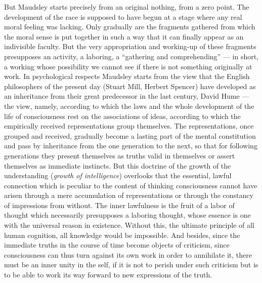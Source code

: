 \documentclass[12pt,a4paper,openany]{book}
\newcommand{\opage}[1]{\marginnote{\footnotesize\textit{[#1]}}}
\begin{document}
\opage{328}But Maudsley starts precisely from an original nothing,
from a zero point. The development of the race is supposed to have begun at
a stage where any real moral feeling was lacking. Only
gradually are the fragments gathered from which the moral
sense is put together in such a way that it can finally appear
as an indivisible faculty. But the very appropriation and working-up
of these fragments presupposes an activity, a
laboring, a ``gathering and comprehending'' --- in short, a working
whose possibility we cannot see if there is not
something originally at work. In psychological respects
Maudsley starts from the view that the English philosophers
of the present day (Stuart Mill, Herbert Spencer) have developed
as an inheritance from their great predecessor in the last century,
David Hume --- the view, namely, according to which the laws and the
whole development of the life of consciousness rest on the associations of ideas,
according to which the empirically received representations group
themselves. The representations, once grouped and received,
gradually become a lasting part of the mental constitution
and pass by inheritance from the one generation to the next, so that
for following generations they present themselves as truths valid in themselves
or assert themselves as immediate instincts.
But this doctrine of the growth of the understanding (\textit{growth of intelligence})
overlooks that the essential, lawful connection
which is peculiar to the content of thinking consciousness
cannot have arisen through a mere accumulation of representations
or through the constancy of impressions from without. The
inner lawfulness is the fruit of a labor of thought which necessarily
presupposes a laboring thought, whose essence is
one with the universal reason in existence. Without this, the
ultimate principle of all human cognition, all
knowledge would be impossible. And besides, since the immediate truths
in the course of time become objects of criticism, since consciousness
can thus turn against its own work in order to annihilate
it, there must be an inner unity in the self, if it is not
to perish under such criticism but is to be able to
work its way forward to new expressions of the truth.
\end{document}

